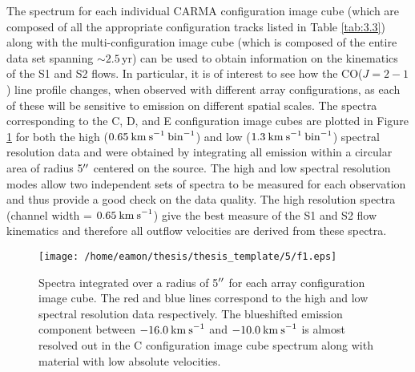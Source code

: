 The spectrum for each individual CARMA configuration image cube (which are composed of all the appropriate configuration tracks listed in Table \ref{tab:3.3}) along with the multi-configuration image cube (which is composed of the entire data set  spanning $\sim 2.5$\,yr) can be used to obtain information on the kinematics of the S1 and S2 flows. In particular, it is of interest to see how the CO($J=2-1$) line profile changes, when observed  with different array configurations, as each of these will be sensitive to emission on different spatial scales. The spectra corresponding  to the C, D, and E configuration image cubes are plotted in Figure \ref{fig:5.4} for both the high ($0.65\>{\rm km\>s}^{-1}\> \rm{bin}^{-1}$) and low ($1.3\>{\rm km\>s}^{-1}\> \rm{bin}^{-1}$) spectral resolution data and were obtained by integrating all emission within a circular area of radius 5$^{\prime\prime}$ centered on the source. The high and low spectral resolution modes allow two independent sets of spectra to be measured for each observation and thus provide a good check on the data quality. The high resolution  spectra (channel width = $0.65\>{\rm km\>s}^{-1}$) give the best measure of the S1 and S2 flow kinematics and therefore all outflow velocities are derived from these spectra.

\begin{figure}[!ht]
\centering 
\texttt{[image: /home/eamon/thesis/thesis\_template/5/f1.eps]}
\caption[Spectra for each CARMA configuration]{Spectra integrated over a radius of 5$^{\prime\prime}$ for each array configuration image cube. The red and blue lines correspond to the high and low spectral resolution data respectively. The blueshifted emission component between $-16.0\>{\rm km\>s}^{-1}$ and $-10.0\>{\rm km\>s}^{-1}$ is almost resolved out in the C configuration image cube spectrum along with material with low absolute velocities. }
\label{fig:5.4}
\end{figure}

